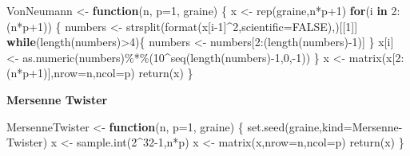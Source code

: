 \documentclass[
]{article}
\newenvironment{Shaded}{\begin{snugshade}}{\end{snugshade}}
\newcommand{\AttributeTok}[1]{\textcolor[rgb]{0.77,0.63,0.00}{#1}}
\newcommand{\ConstantTok}[1]{\textcolor[rgb]{0.00,0.00,0.00}{#1}}
\newcommand{\ControlFlowTok}[1]{\textcolor[rgb]{0.13,0.29,0.53}{\textbf{#1}}}
\newcommand{\DecValTok}[1]{\textcolor[rgb]{0.00,0.00,0.81}{#1}}
\newcommand{\FunctionTok}[1]{\textcolor[rgb]{0.00,0.00,0.00}{#1}}
\newcommand{\NormalTok}[1]{#1}
\newcommand{\OtherTok}[1]{\textcolor[rgb]{0.56,0.35,0.01}{#1}}
\newcommand{\SpecialCharTok}[1]{\textcolor[rgb]{0.00,0.00,0.00}{#1}}
\newcommand{\StringTok}[1]{\textcolor[rgb]{0.31,0.60,0.02}{#1}}
\begin{document}
\begin{Shaded}
\begin{Highlighting}[]
\NormalTok{VonNeumann }\OtherTok{\textless{}{-}} \ControlFlowTok{function}\NormalTok{(n, }\AttributeTok{p=}\DecValTok{1}\NormalTok{, graine)}
\NormalTok{\{}
\NormalTok{  x }\OtherTok{\textless{}{-}}  \FunctionTok{rep}\NormalTok{(graine,n}\SpecialCharTok{*}\NormalTok{p}\SpecialCharTok{+}\DecValTok{1}\NormalTok{)}
  \ControlFlowTok{for}\NormalTok{(i }\ControlFlowTok{in} \DecValTok{2}\SpecialCharTok{:}\NormalTok{(n}\SpecialCharTok{*}\NormalTok{p}\SpecialCharTok{+}\DecValTok{1}\NormalTok{))}
\NormalTok{  \{}
\NormalTok{    numbers }\OtherTok{\textless{}{-}} \FunctionTok{strsplit}\NormalTok{(}\FunctionTok{format}\NormalTok{(x[i}\DecValTok{{-}1}\NormalTok{]}\SpecialCharTok{\^{}}\DecValTok{2}\NormalTok{,}\AttributeTok{scientific=}\ConstantTok{FALSE}\NormalTok{),}\StringTok{\textquotesingle{}\textquotesingle{}}\NormalTok{)[[}\DecValTok{1}\NormalTok{]]}
    \ControlFlowTok{while}\NormalTok{(}\FunctionTok{length}\NormalTok{(numbers)}\SpecialCharTok{\textgreater{}}\DecValTok{4}\NormalTok{)\{ }
\NormalTok{        numbers }\OtherTok{\textless{}{-}}\NormalTok{ numbers[}\DecValTok{2}\SpecialCharTok{:}\NormalTok{(}\FunctionTok{length}\NormalTok{(numbers)}\SpecialCharTok{{-}}\DecValTok{1}\NormalTok{)] }
\NormalTok{    \}}
\NormalTok{    x[i] }\OtherTok{\textless{}{-}} \FunctionTok{as.numeric}\NormalTok{(numbers)}\SpecialCharTok{\%*\%}\NormalTok{(}\DecValTok{10}\SpecialCharTok{\^{}}\FunctionTok{seq}\NormalTok{(}\FunctionTok{length}\NormalTok{(numbers)}\SpecialCharTok{{-}}\DecValTok{1}\NormalTok{,}\DecValTok{0}\NormalTok{,}\SpecialCharTok{{-}}\DecValTok{1}\NormalTok{))}
\NormalTok{  \}}
\NormalTok{  x }\OtherTok{\textless{}{-}} \FunctionTok{matrix}\NormalTok{(x[}\DecValTok{2}\SpecialCharTok{:}\NormalTok{(n}\SpecialCharTok{*}\NormalTok{p}\SpecialCharTok{+}\DecValTok{1}\NormalTok{)],}\AttributeTok{nrow=}\NormalTok{n,}\AttributeTok{ncol=}\NormalTok{p)}
  \FunctionTok{return}\NormalTok{(x)}
\NormalTok{\}}
\end{Highlighting}
\end{Shaded}

\textbf{Mersenne Twister}

\begin{Shaded}
\begin{Highlighting}[]
\NormalTok{MersenneTwister }\OtherTok{\textless{}{-}} \ControlFlowTok{function}\NormalTok{(n, }\AttributeTok{p=}\DecValTok{1}\NormalTok{, graine)}
\NormalTok{\{}
  \FunctionTok{set.seed}\NormalTok{(graine,}\AttributeTok{kind=}\StringTok{\textquotesingle{}Mersenne{-}Twister\textquotesingle{}}\NormalTok{)}
\NormalTok{  x }\OtherTok{\textless{}{-}} \FunctionTok{sample.int}\NormalTok{(}\DecValTok{2}\SpecialCharTok{\^{}}\DecValTok{32{-}1}\NormalTok{,n}\SpecialCharTok{*}\NormalTok{p)}
\NormalTok{  x }\OtherTok{\textless{}{-}} \FunctionTok{matrix}\NormalTok{(x,}\AttributeTok{nrow=}\NormalTok{n,}\AttributeTok{ncol=}\NormalTok{p)}
  \FunctionTok{return}\NormalTok{(x)}
\NormalTok{\}}
\end{Highlighting}
\end{Shaded}
\end{document}
